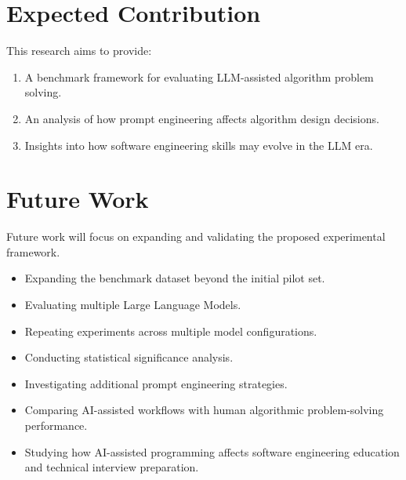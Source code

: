 \documentclass[11pt,a4paper]{article}
\begin{document}


















\section{Expected Contribution}

This research aims to provide:

\begin{enumerate}

\item
A benchmark framework for evaluating LLM-assisted algorithm problem solving.

\item
An analysis of how prompt engineering affects algorithm design decisions.

\item
Insights into how software engineering skills may evolve in the LLM era.

\end{enumerate}


\section{Future Work}

Future work will focus on expanding and validating the proposed experimental
framework.

\begin{itemize}

\item Expanding the benchmark dataset beyond the initial pilot set.

\item Evaluating multiple Large Language Models.

\item Repeating experiments across multiple model configurations.

\item Conducting statistical significance analysis.

\item Investigating additional prompt engineering strategies.

\item Comparing AI-assisted workflows with human algorithmic problem-solving
performance.

\item Studying how AI-assisted programming affects software engineering
education and technical interview preparation.

\end{itemize}
\end{document}
